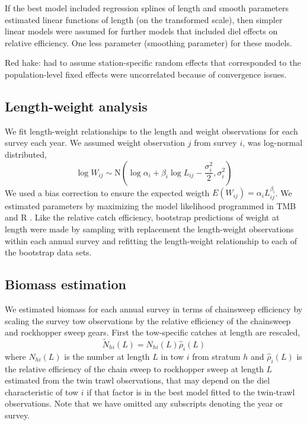 \documentclass[]{article}
\begin{document}
If the best model included regression splines of length and smooth
parameters estimated linear functions of length (on the transformed
scale), then simpler linear models were assumed for further models that
included diel effects on relative efficiency. One less parameter
(smoothing parameter) for these models.

Red hake: had to assume station-specific random effects that
corresponded to the population-level fixed effects were uncorrelated
because of convergence issues.

\hypertarget{length-weight-analysis}{%
\subsection{Length-weight analysis}\label{length-weight-analysis}}

We fit length-weight relationships to the length and weight observations
for each survey each year. We assumed weight observation \(j\) from
survey \(i\), was log-normal distributed, \begin{equation}\label{wal}
 \log W_{ij} \sim \text{N}\left(\log \alpha_i + \beta_i \log L_{ij} - \frac{\sigma_i^2}{2}, \sigma_i^2\right)
\end{equation} We used a bias correction to ensure the expected weigth
\(E(W_{ij})= \alpha_i L_{ij}^{\beta_i}\). We estimated parameters by
maximizing the model likelihood programmed in TMB
\citep{kristensenetal16} and R \citep{R19}. Like the relative catch
efficiency, bootstrap predictions of weight at length were made by
sampling with replacement the length-weight observations within each
annual survey and refitting the length-weight relationship to each of
the bootstrap data sets.

\hypertarget{biomass-estimation}{%
\subsection{Biomass estimation}\label{biomass-estimation}}

We estimated biomass for each annual survey in terms of chainsweep
efficiency by scaling the survey tow observations by the relative
efficiency of the chainsweep and rockhopper sweep gears. First the
tow-specific catches at length are rescaled, \begin{equation}\label{nal}
\widetilde N_{hi}\left(L\right) = N_{hi}\left(L\right)\widehat \rho_i\left(L\right)
\end{equation} where \(N_{hi}(L)\) is the number at length \(L\) in tow
\(i\) from stratum \(h\) and \(\widehat \rho_i\left(L\right)\) is the
relative efficiency of the chain sweep to rockhopper sweep at length
\(L\) estimated from the twin trawl observations, that may depend on the
diel characteristic of tow \(i\) if that factor is in the best model
fitted to the twin-trawl observations. Note that we have omitted any
subscripts denoting the year or survey.
\end{document}
